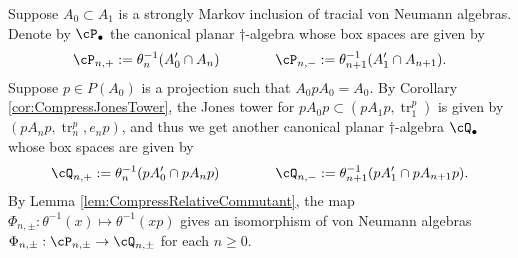 \documentclass[11pt]{article}
\theoremstyle{plain}
\theoremstyle{definition}
\DeclareMathOperator{\tr}{tr}
\newcommand{\dave}[1]{\marginpar{\tiny \textcolor{orange}{DP: #1}}}
\begin{document}

Suppose $A_0\subset A_1$ is a strongly Markov inclusion of tracial von Neumann algebras.
Denote by $\cP_\bullet$ the canonical planar $\dag$-algebra whose box spaces are given by
\dave{I'd like to suppress the maps $\theta$, since they are really annoying to keep track of}
$$
\cP_{n,+}
:=
\theta_n^{-1}(A_0'\cap A_n)
\qquad\qquad
\cP_{n,-}
:=
\theta_{n+1}^{-1}(A_1'\cap A_{n+1}).
$$
Suppose $p\in P(A_0)$ is a projection such that $A_0pA_0 = A_0$.
By Corollary \ref{cor:CompressJonesTower}, the Jones tower for $pA_0p \subset (pA_1p, \tr^p_1)$ is given by $(pA_np, \tr^p_n, e_np)$, and thus we get another canonical planar $\dag$-algebra $\cQ_\bullet$ whose box spaces are given by
$$
\cQ_{n,+}
:=
\theta_n^{-1}(pA_0'\cap pA_np)
\qquad\qquad
\cQ_{n,-}
:=
\theta_{n+1}^{-1}(pA_1'\cap pA_{n+1}p).
$$
By Lemma \ref{lem:CompressRelativeCommutant}, the map $\Phi_{n,\pm}:\theta^{-1}(x)\mapsto \theta^{-1}(xp)$ gives an isomorphism of von Neumann algebras $\Phi_{n,\pm}:\cP_{n,\pm}\to \cQ_{n,\pm}$ for each $n\geq 0$.
\end{document}

